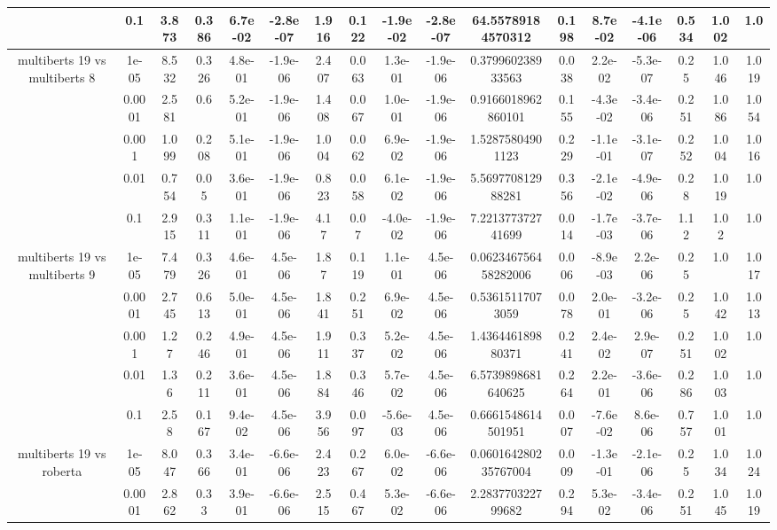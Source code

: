 \begin{tabular}{|c|c|c|c|c|c|c|c|c|c|c|c|c|c|c|c|c|}
 & 0.1 & 3.873 & 0.386 & 6.7e-02 & -2.8e-07 & 1.916 & 0.122 & -1.9e-02 & -2.8e-07 & 64.55789184570312 & 0.198 & 8.7e-02 & -4.1e-06 & 0.534 & 1.002 & 1.0 \\
\hline
\multirow{5}{*}{multiberts 19 vs multiberts 8} & 1e-05 & 8.532 & 0.326 & 4.8e-01 & -1.9e-06 & 2.407 & 0.063 & 1.3e-01 & -1.9e-06 & 0.379960238933563 & 0.038 & 2.2e-02 & -5.3e-07 & 0.25 & 1.046 & 1.019 \\
 & 0.0001 & 2.581 & 0.6 & 5.2e-01 & -1.9e-06 & 1.408 & 0.067 & 1.0e-01 & -1.9e-06 & 0.9166018962860101 & 0.155 & -4.3e-02 & -3.4e-06 & 0.251 & 1.086 & 1.054 \\
 & 0.001 & 1.099 & 0.208 & 5.1e-01 & -1.9e-06 & 1.004 & 0.062 & 6.9e-02 & -1.9e-06 & 1.52875804901123 & 0.229 & -1.1e-01 & -3.1e-07 & 0.252 & 1.004 & 1.016 \\
 & 0.01 & 0.754 & 0.05 & 3.6e-01 & -1.9e-06 & 0.823 & 0.058 & 6.1e-02 & -1.9e-06 & 5.569770812988281 & 0.356 & -2.1e-02 & -4.9e-06 & 0.28 & 1.019 & 1.0 \\
 & 0.1 & 2.915 & 0.311 & 1.1e-01 & -1.9e-06 & 4.17 & 0.07 & -4.0e-02 & -1.9e-06 & 7.221377372741699 & 0.014 & -1.7e-03 & -3.7e-06 & 1.12 & 1.02 & 1.0 \\
\hline
\multirow{5}{*}{multiberts 19 vs multiberts 9} & 1e-05 & 7.479 & 0.326 & 4.6e-01 & 4.5e-06 & 1.87 & 0.119 & 1.1e-01 & 4.5e-06 & 0.062346756458282006 & 0.006 & -8.9e-03 & 2.2e-06 & 0.25 & 1.0 & 1.017 \\
 & 0.0001 & 2.745 & 0.613 & 5.0e-01 & 4.5e-06 & 1.841 & 0.251 & 6.9e-02 & 4.5e-06 & 0.53615117073059 & 0.078 & 2.0e-01 & -3.2e-06 & 0.25 & 1.042 & 1.013 \\
 & 0.001 & 1.27 & 0.246 & 4.9e-01 & 4.5e-06 & 1.911 & 0.337 & 5.2e-02 & 4.5e-06 & 1.436446189880371 & 0.241 & 2.4e-02 & 2.9e-07 & 0.251 & 1.002 & 1.0 \\
 & 0.01 & 1.36 & 0.211 & 3.6e-01 & 4.5e-06 & 1.884 & 0.346 & 5.7e-02 & 4.5e-06 & 6.5739898681640625 & 0.264 & 2.2e-01 & -3.6e-06 & 0.286 & 1.003 & 1.0 \\
 & 0.1 & 2.58 & 0.167 & 9.4e-02 & 4.5e-06 & 3.956 & 0.097 & -5.6e-03 & 4.5e-06 & 0.6661548614501951 & 0.007 & -7.6e-02 & 8.6e-06 & 0.757 & 1.001 & 1.0 \\
\hline
\multirow{5}{*}{multiberts 19 vs roberta } & 1e-05 & 8.047 & 0.366 & 3.4e-01 & -6.6e-06 & 2.423 & 0.267 & 6.0e-02 & -6.6e-06 & 0.060164280235767004 & 0.009 & -1.3e-01 & -2.1e-06 & 0.25 & 1.034 & 1.024 \\
 & 0.0001 & 2.862 & 0.33 & 3.9e-01 & -6.6e-06 & 2.515 & 0.467 & 5.3e-02 & -6.6e-06 & 2.283770322799682 & 0.294 & 5.3e-02 & -3.4e-06 & 0.251 & 1.045 & 1.019 \\

\end{tabular}
